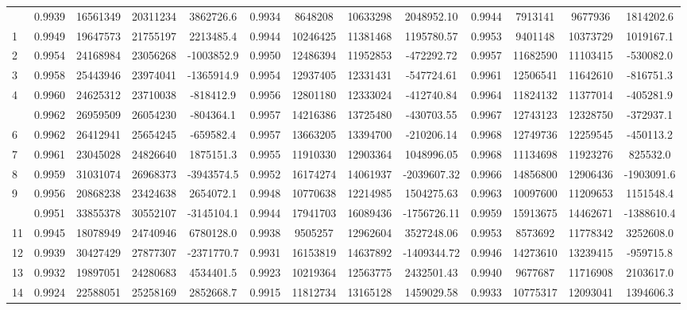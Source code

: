 \documentclass[
  12pt,
]{article}
\begin{document}
\begin{longtable}[t]{lcccccccccccc}
\endfoot
\bottomrule
\endlastfoot
0 & 0.9939 & 16561349 & 20311234 & 3862726.6 & 0.9934 & 8648208 & 10633298 & 2048952.10 & 0.9944 & 7913141 & 9677936 & 1814202.6\\
1 & 0.9949 & 19647573 & 21755197 & 2213485.4 & 0.9944 & 10246425 & 11381468 & 1195780.57 & 0.9953 & 9401148 & 10373729 & 1019167.1\\
2 & 0.9954 & 24168984 & 23056268 & -1003852.9 & 0.9950 & 12486394 & 11952853 & -472292.72 & 0.9957 & 11682590 & 11103415 & -530082.0\\
3 & 0.9958 & 25443946 & 23974041 & -1365914.9 & 0.9954 & 12937405 & 12331431 & -547724.61 & 0.9961 & 12506541 & 11642610 & -816751.3\\
4 & 0.9960 & 24625312 & 23710038 & -818412.9 & 0.9956 & 12801180 & 12333024 & -412740.84 & 0.9964 & 11824132 & 11377014 & -405281.9\\
\addlinespace
5 & 0.9962 & 26959509 & 26054230 & -804364.1 & 0.9957 & 14216386 & 13725480 & -430703.55 & 0.9967 & 12743123 & 12328750 & -372937.1\\
6 & 0.9962 & 26412941 & 25654245 & -659582.4 & 0.9957 & 13663205 & 13394700 & -210206.14 & 0.9968 & 12749736 & 12259545 & -450113.2\\
7 & 0.9961 & 23045028 & 24826640 & 1875151.3 & 0.9955 & 11910330 & 12903364 & 1048996.05 & 0.9968 & 11134698 & 11923276 & 825532.0\\
8 & 0.9959 & 31031074 & 26968373 & -3943574.5 & 0.9952 & 16174274 & 14061937 & -2039607.32 & 0.9966 & 14856800 & 12906436 & -1903091.6\\
9 & 0.9956 & 20868238 & 23424638 & 2654072.1 & 0.9948 & 10770638 & 12214985 & 1504275.63 & 0.9963 & 10097600 & 11209653 & 1151548.4\\
\addlinespace
10 & 0.9951 & 33855378 & 30552107 & -3145104.1 & 0.9944 & 17941703 & 16089436 & -1756726.11 & 0.9959 & 15913675 & 14462671 & -1388610.4\\
11 & 0.9945 & 18078949 & 24740946 & 6780128.0 & 0.9938 & 9505257 & 12962604 & 3527248.06 & 0.9953 & 8573692 & 11778342 & 3252608.0\\
12 & 0.9939 & 30427429 & 27877307 & -2371770.7 & 0.9931 & 16153819 & 14637892 & -1409344.72 & 0.9946 & 14273610 & 13239415 & -959715.8\\
13 & 0.9932 & 19897051 & 24280683 & 4534401.5 & 0.9923 & 10219364 & 12563775 & 2432501.43 & 0.9940 & 9677687 & 11716908 & 2103617.0\\
14 & 0.9924 & 22588051 & 25258169 & 2852668.7 & 0.9915 & 11812734 & 13165128 & 1459029.58 & 0.9933 & 10775317 & 12093041 & 1394606.3\\

\end{longtable}
\end{document}
